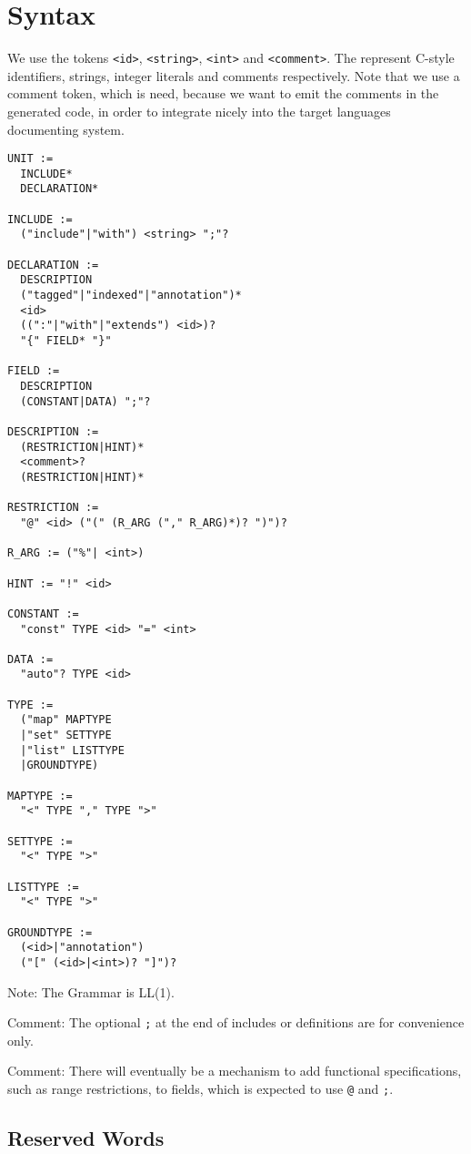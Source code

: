 \documentclass[a4paper,10pt]{article}
\begin{document}
\section{Syntax}

We use the tokens \verb/<id>/, \verb/<string>/, \verb/<int>/ and \verb/<comment>/. The represent C-style identifiers, strings, integer literals and comments respectively. Note that we use a comment token, which is need, because we want to emit the comments in the generated code, in order to integrate nicely into the target languages documenting system.

\begin{verbatim}
UNIT :=
  INCLUDE*
  DECLARATION*

INCLUDE := 
  ("include"|"with") <string> ";"?

DECLARATION :=
  DESCRIPTION
  ("tagged"|"indexed"|"annotation")*
  <id>
  ((":"|"with"|"extends") <id>)?
  "{" FIELD* "}"
  
FIELD :=
  DESCRIPTION
  (CONSTANT|DATA) ";"?
  
DESCRIPTION := 
  (RESTRICTION|HINT)*
  <comment>?
  (RESTRICTION|HINT)*
  
RESTRICTION :=
  "@" <id> ("(" (R_ARG ("," R_ARG)*)? ")")?
  
R_ARG := ("%"| <int>)

HINT := "!" <id>
  
CONSTANT :=
  "const" TYPE <id> "=" <int>
  
DATA :=
  "auto"? TYPE <id>
  
TYPE :=
  ("map" MAPTYPE
  |"set" SETTYPE
  |"list" LISTTYPE
  |GROUNDTYPE)
  
MAPTYPE :=
  "<" TYPE "," TYPE ">"
  
SETTYPE :=
  "<" TYPE ">"
  
LISTTYPE :=
  "<" TYPE ">"
  
GROUNDTYPE :=
  (<id>|"annotation")
  ("[" (<id>|<int>)? "]")?

\end{verbatim}
Note: The Grammar is LL(1).

Comment: The optional \texttt{;} at the end of includes or definitions are for convenience only.

Comment: There will eventually be a mechanism to add functional specifications, such as range restrictions, to fields, which is expected to use \texttt{@} and \texttt{;}.

\subsection{Reserved Words}
\end{document}

